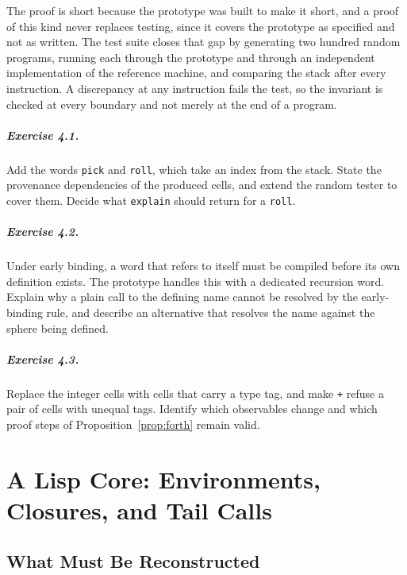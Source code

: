 The proof is short because the prototype was built to make it short, and a proof of this kind never replaces testing, since it covers the prototype as specified and not as written. The test suite closes that gap by generating two hundred random programs, running each through the prototype and through an independent implementation of the reference machine, and comparing the stack after every instruction. A discrepancy at any instruction fails the test, so the invariant is checked at every boundary and not merely at the end of a program.

\paragraph{Exercise 4.1.} Add the words \texttt{pick} and \texttt{roll}, which take an index from the stack. State the provenance dependencies of the produced cells, and extend the random tester to cover them. Decide what \texttt{explain} should return for a \texttt{roll}.

\paragraph{Exercise 4.2.} Under early binding, a word that refers to itself must be compiled before its own definition exists. The prototype handles this with a dedicated recursion word. Explain why a plain call to the defining name cannot be resolved by the early-binding rule, and describe an alternative that resolves the name against the sphere being defined.

\paragraph{Exercise 4.3.} Replace the integer cells with cells that carry a type tag, and make \texttt{+} refuse a pair of cells with unequal tags. Identify which observables change and which proof steps of Proposition~\ref{prop:forth} remain valid.

\chapter{A Lisp Core: Environments, Closures, and Tail Calls}

\section{What Must Be Reconstructed}

